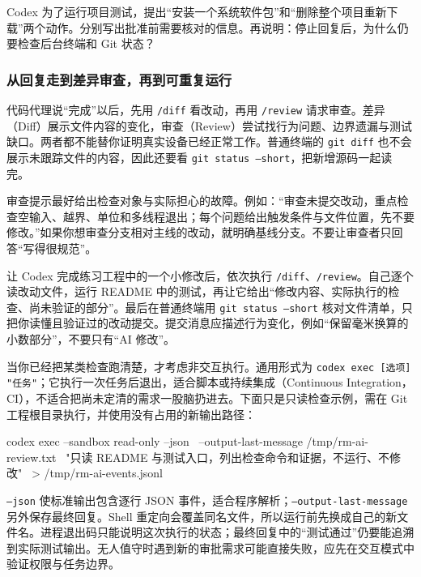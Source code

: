 \begin{exercise}\label{ex:ai-cli-permissions}
Codex 为了运行项目测试，提出“安装一个系统软件包”和“删除整个项目重新下载”两个动作。分别写出批准前需要核对的信息。再说明：停止回复后，为什么仍要检查后台终端和 Git 状态？
\end{exercise}

\subsubsection{从回复走到差异审查，再到可重复运行}

代码代理说“完成”以后，先用 \texttt{/diff} 看改动，再用 \texttt{/review} 请求审查。差异（Diff）展示文件内容的变化，审查（Review）尝试找行为问题、边界遗漏与测试缺口。两者都不能替你证明真实设备已经正常工作。普通终端的 \texttt{git diff} 也不会展示未跟踪文件的内容，因此还要看 \texttt{git status --short}，把新增源码一起读完。

审查提示最好给出检查对象与实际担心的故障。例如：“审查未提交改动，重点检查空输入、越界、单位和多线程退出；每个问题给出触发条件与文件位置，先不要修改。”如果你想审查分支相对主线的改动，就明确基线分支。不要让审查者只回答“写得很规范”。

\begin{example}[把一次修复变成可核对的交付]
让 Codex 完成练习工程中的一个小修改后，依次执行 \texttt{/diff}、\texttt{/review}。自己逐个读改动文件，运行 README 中的测试，再让它给出“修改内容、实际执行的检查、尚未验证的部分”。最后在普通终端用 \texttt{git status --short} 核对文件清单，只把你读懂且验证过的改动提交。提交消息应描述行为变化，例如“保留毫米换算的小数部分”，不要只有“AI 修改”。
\end{example}

当你已经把某类检查跑清楚，才考虑非交互执行。通用形式为 \texttt{codex exec [选项] "任务"}；它执行一次任务后退出，适合脚本或持续集成（Continuous Integration，CI），不适合把尚未定清的需求一股脑扔进去。下面只是只读检查示例，需在 Git 工程根目录执行，并使用没有占用的新输出路径：
\begin{tbash}
codex exec --sandbox read-only --json \
  --output-last-message /tmp/rm-ai-review.txt \
  "只读 README 与测试入口，列出检查命令和证据，不运行、不修改" \
  > /tmp/rm-ai-events.jsonl
\end{tbash}
\texttt{--json} 使标准输出包含逐行 JSON 事件，适合程序解析；\texttt{--output-last-message} 另外保存最终回复。Shell 重定向会覆盖同名文件，所以运行前先换成自己的新文件名。进程退出码只能说明这次执行的状态；最终回复中的“测试通过”仍要能追溯到实际测试输出。无人值守时遇到新的审批需求可能直接失败，应先在交互模式中验证权限与任务边界。

